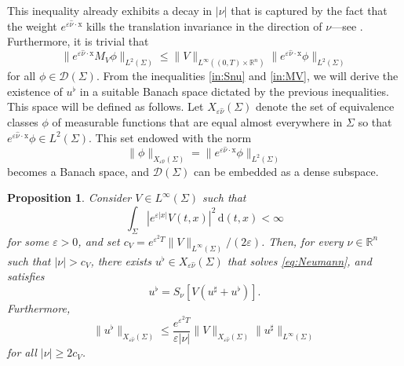 \documentclass[10pt,a4paper]{amsart}
\newtheorem{proposition}{Proposition}[section]
\newcommand{\R}{\mathbb{R}}
\newcommand{\dd}{\mathrm{d}}
\newcommand{\tm}{\mathrm{t}}
\newcommand{\x}{\mathrm{x}}
\newcommand{\marnote}[1]{\marginpar{\footnotesize #1}} %
\begin{document}
This inequality already exhibits a decay in $|\nu|$ that is captured by the fact that the 
weight $e^{\varepsilon \hat{\nu} \cdot \x}$ kills the translation invariance in the direction 
of $\nu$---see .
Furthermore, it is trivial that
\begin{equation}
\label{in:MV}
\| e^{\varepsilon \hat{\nu} \cdot \x} M_V \phi \|_{L^2(\Sigma)} \leq \| V \|_{L^\infty ((0, T) \times \R^n)} \| e^{\varepsilon \hat{\nu} \cdot \x} \phi \|_{L^2(\Sigma)}
\end{equation}
for all $\phi \in \mathcal{D}(\Sigma)$.
From the inequalities \eqref{in:Snu} and \eqref{in:MV}, we will derive the existence of 
$u^\flat$ in a suitable Banach space dictated by the previous inequalities. This space will be defined as follows. Let $X_{\varepsilon\hat{\nu}}(\Sigma)$ denote 
the set of equivalence classes $\phi$ of measurable functions 
that are equal almost everywhere in $\Sigma$ so that 
$e^{\varepsilon \hat{\nu} \cdot \x} \phi \in L^2(\Sigma)$.
This set endowed with the norm
\[ \| \phi \|_{X_{\varepsilon \hat{\nu}}(\Sigma)} = \| e^{\varepsilon \hat{\nu} \cdot \x} \phi \|_{L^2(\Sigma)} \]
becomes a Banach space, and $\mathcal{D}(\Sigma)$ can be embedded as a dense 
subspace.

\begin{proposition}\label{Prop CGO1}\sl
Consider $V \in L^\infty (\Sigma) $ such that
\begin{equation*}
\int_{\Sigma} | e^{\varepsilon |x|} V(t, x) |^2 \, \dd (t, x) < \infty
\end{equation*}
for some $\varepsilon > 0$, and set
$c_V = e^{\varepsilon^2 T} \| V \|_{L^\infty (\Sigma)}/(2\varepsilon)$.
Then, for every $\nu \in \R^n$ such that $|\nu| > c_V$,
there exists $u^\flat \in X_{\varepsilon \hat{\nu}}(\Sigma)$ 
that solves \eqref{eq:Neumann}, and satisfies
\begin{equation}
\label{eq:uflat}
u^\flat = S_\nu [V(u^\sharp + u^\flat)].
\end{equation} 
Furthermore, 
\[ \| u^\flat \|_{X_{\varepsilon \hat{\nu}}(\Sigma)}
\leq \frac{e^{\varepsilon^2 T}}{ \varepsilon |\nu|} 
\| V \|_{X_{\varepsilon \hat{\nu}}(\Sigma)}
\| u^\sharp \|_{L^\infty (\Sigma)} \]
for all $|\nu| \geq 2 c_V$.
\end{proposition}
\end{document}
